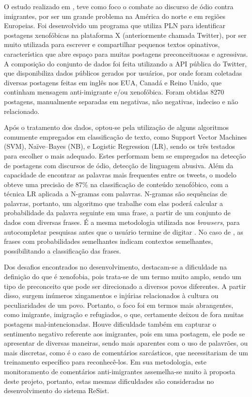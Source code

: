 
O estudo realizado em \textcite{pitropakis2020monitoring}, teve como foco o combate ao discurso de ódio contra imigrantes, por ser um grande problema na América do norte e em regiões Europeias. Foi desenvolvido um programa que utiliza PLN para identificar postagens xenofóbicas na plataforma X (anteriormente chamada Twitter), por ser muito utilizada para escrever e compartilhar pequenos textos opinativos, característica que abre espaço para muitas postagens preconceituosas e agressivas. A composição do conjunto de dados foi feita utilizando a API pública do Twitter, que disponibiliza dados públicos gerados por usuários, por onde foram coletadas diversas postagens feitas em inglês nos EUA, Canadá e Reino Unido, que continham mensagem anti-imigrante e/ou xenofóbica. Foram obtidas 8270 postagens, manualmente separadas em negativas, não negativas, indeciso e não relacionado.

Após o tratamento dos dados, optou-se pela utilização de alguns algoritmos comumente empregados em classificação de texto, como Support Vector Machines (SVM), Naïve–Bayes (NB), e Logistic Regression (LR), sendo os três testados para escolher o mais adequado. Estes performam bem se empregados na detecção de postagens com discursos de ódio, detecção de linguagem abusiva. Além da capacidade de encontrar as palavras mais frequentes entre os tweets, o modelo obteve uma precisão de 87\% na classificação de conteúdo xenofóbico, com a técnica LR aplicada a N-gramas com palavras. N-gramas são sequências de palavras, portanto, um algoritmo que trabalhe com elas poderá calcular a probabilidade da palavra seguinte em uma frase, a partir de um conjunto de dados com diversas frases. É a mesma metodologia utilizada nos \textit{browsers}, para autocompletar pesquisas antes que o usuário termine de digitar \textcite{srinidhi2019understanding}. No caso de \textcite{pitropakis2020monitoring}, as frases com probabilidades semelhantes indicam contextos semelhantes, possibilitando a classificação das frases.

Dos desafios encontrados no desenvolvimento, destacam-se a dificuldade na definição do que é xenofobia, pois trata-se de um termo muito amplo, sendo um tipo de preconceito que pode ser direcionado a diversos povos diferentes. A partir disso, surgem inúmeros xingamentos e injúrias relacionados à cultura ou peculiaridades de um povo. Portanto, o foco foi em termos mais abrangentes, como imigrante, imigração e refugiados, o que, certamente deixou de fora muitas postagens mal-intencionadas. Houve dificuldade também em capturar o sentimento negativo referente aos imigrantes, pois em uma postagem, ele pode se apresentar de diversas maneiras, sendo mais aparentes com o uso de palavrões, ou mais discretas, como é o caso de comentários sarcásticos, que necessitariam de um treinamento específico para reconhecê-los. Em sua metodologia, este monitoramento de comentários anti-imigrantes assemelha-se muito à proposta deste projeto, portanto, estas mesmas dificuldades são consideradas no desenvolvimento do sistema ReSist.


